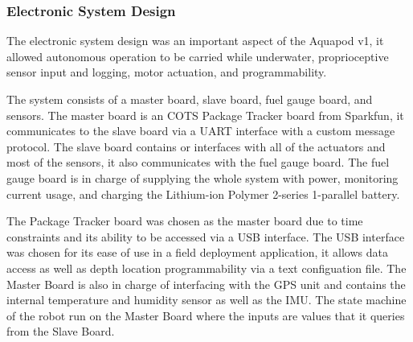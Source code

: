 
%


\subsubsection{Electronic System Design}

The electronic system design was an important aspect of the Aquapod v1, it allowed autonomous operation to be carried while underwater, proprioceptive sensor input and logging, motor actuation, and programmability. 

The system consists of a master board, slave board, fuel gauge board, and sensors. The master board is an COTS Package Tracker board from Sparkfun, it communicates to the slave board via a UART interface with a custom message protocol. The slave board contains or interfaces with all of the actuators and most of the sensors, it also communicates with the fuel gauge board. The fuel gauge board is in charge of supplying the whole system with power, monitoring current usage, and charging the Lithium-ion Polymer 2-series 1-parallel battery. 

The Package Tracker board was chosen as the master board due to time constraints and its ability to be accessed via a USB interface. The USB interface was chosen for its ease of use in a field deployment application, it allows data access as well as depth location programmability via a text configuation file. The Master Board is also in charge of interfacing with the GPS unit and contains the internal temperature and humidity sensor as well as the IMU. The state machine of the robot run on the Master Board where the inputs are values that it queries from the Slave Board. 


